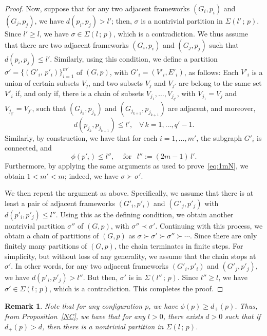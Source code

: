 \documentclass[10pt,twocolumn,twoside]{IEEEtran}
\newtheorem{Remark}{Remark}
\renewcommand{\(}{\left (}
\renewcommand{\)}{\right )}
\renewcommand{\;}{\,;\,}
\begin{document}
\begin{proof}
   
Now, suppose that for any two adjacent frameworks $(G_i,p_i)$ and $(G_j,p_j)$, we have
$
d(p_i,p_j) > l'$;  
then, $\sigma$ is a nontrivial partition in $\Sigma(l' \; p)$. Since $l' \ge l$, we have $\sigma \in \Sigma(l\; p)$, which is a contradiction. 
We thus assume that there are two adjacent frameworks $(G_i,p_i)$ and $(G_j,p_j)$ such that  $d(p_i,p_j) \le l'$. 
Similarly, using this condition, we define a  partition $\sigma' = \{(G'_i, \, p'_i)\}^{m'}_{i=1}$ of $(G,p)$, with $G'_i = (V'_i, E'_i)$,  
as follows: Each $V'_i$ is a union of certain subsets $V_j$, and two subsets $V_{j}$ and $V_{j'}$ are belong to the same set $V'_i$ if, and only if, there is a chain of subsets $V_{j_1},\ldots,V_{j_{q'}}$,  with $V_{j_1}=V_j$ and $V_{j_{q'}}=V_{j'}$,  such that 
$(G_{j_k}, p_{j_k})$ and  $(G_{j_{k+1}}, p_{j_{k+1}})$ are adjacent, and moreover, 
$$d(p_{j_k},p_{j_{k+1}})  \le l', \hspace{10pt}  \forall \, k = 1,\ldots, q'-1.$$
Similarly, by construction,  we have that for each $i = 1,\ldots, m'$, the subgraph $G'_i$ is connected, and  
$$ \phi(p'_i) \le l'', \hspace{10pt} \mbox{ for } \hspace{5pt} l'' :=  (2m -1) \, l'. $$ 
Furthermore, by applying the same arguments as used to prove~\eqref{eq:1mN}, we obtain  
$1 < m' < m$; indeed, we have $\sigma \succ \sigma'$.  

We then repeat the argument as above. Specifically, we assume  that there is at least a pair of adjacent frameworks $(G'_i, p'_i)$ and $(G'_j, p'_j)$ with $d(p'_i,p'_j) \le l''$. Using this  as the defining condition, we obtain another nontrivial partition $\sigma''$ of $(G,p)$, with $\sigma'' \prec \sigma' $. 
Continuing with this process, we obtain a chain of partitions of $(G,p)$ as 
$
\sigma \succ \sigma' \succ \sigma'' \succ\cdots
$. 
Since there are only finitely many partitions of $(G,p)$, the chain terminates in finite steps. For simplicity, but without loss of any generality, we assume that the chain stops at $\sigma'$. In other words, for any two adjacent frameworks $(G'_i, p'_i)$ and $(G'_j, p'_j)$, we have $d(p'_i,p'_j)> l'' $. 
But then, $\sigma'$ is in  $\Sigma(l''\; p)$. Since $l'' \ge l$,  we have $\sigma'\in \Sigma(l\; p)$,  which is a contradiction. This completes the proof. 
\end{proof}

\begin{Remark}\label{rmk:2}
Note that for any configuration $p$, we have $\phi(p) \ge d_+(p)$. Thus, from Proposition~\ref{NC}, we have that for any $l > 0$, there exists $d > 0$ such that if $d_+(p)> d$, then there is a nontrivial partition in $\Sigma(l\; p)$.
\end{Remark}
\end{document}
